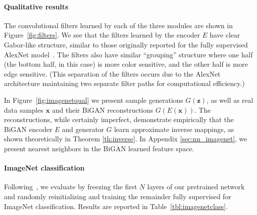 \documentclass{article}
\renewcommand{\vec}[1]{\mathbf{#1}}
\newcommand{\x}{\vec{x}}
\newcommand{\z}{\vec{z}}
\newcommand{\reffig}[1]{Figure~\ref{fig:#1}}
\newcommand{\reftbl}[1]{Table~\ref{tbl:#1}}
\begin{document}



\paragraph{Qualitative results}
The convolutional filters learned by each of the three modules are shown in \reffig{filters}.
We see that the filters learned by the encoder $E$ have clear Gabor-like structure,
similar to those originally reported for the fully supervised AlexNet model~\citep{supervision}.
The filters also have similar ``grouping'' structure where one half (the bottom half, in this case) is more color sensitive,
and the other half is more edge sensitive.
(This separation of the filters occurs due to the AlexNet architecture
maintaining two separate filter paths for computational efficiency.)


In \reffig{imagenetqual} we present sample generations $G(\z)$,
as well as real data samples $\x$ and their BiGAN reconstructions $G(E(\x))$.
The reconstructions, while certainly imperfect,
demonstrate empirically that the BiGAN encoder $E$ and generator $G$ learn approximate inverse mappings,
as shown theoretically in Theorem \ref{th:inverse}.
In Appendix \ref{sec:nn_imagenet}, we present nearest neighbors in the BiGAN learned feature space.

\paragraph{ImageNet classification}

Following~\citet{jigsaw}, we evaluate by freezing the first $N$ layers of our pretrained network and randomly reinitializing and training the remainder fully supervised for ImageNet classification.
Results are reported in \reftbl{imagenetclass}.

\end{document}
